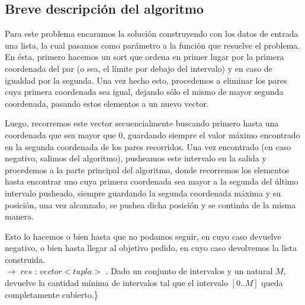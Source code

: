 \documentclass[a4paper, 10pt]{article}
\begin{document}
\subsection{Breve descripción del algoritmo}

Para este problema encaramos la solución construyendo con los datos de entrada una lista, la cual pasamos como parámetro a la función que resuelve el problema. En ésta, primero hacemos un sort que ordena en primer lugar por la primera coordenada del par (o sea, el límite por debajo del intervalo) y en caso de igualdad por la segunda. Una vez hecho esto, procedemos a eliminar los pares cuya primera coordenada sea igual, dejando sólo el mismo de mayor segunda coordenada, pasando estos elementos a un nuevo vector.

Luego, recorremos este vector secuencialmente buscando primero hasta una coordenada que sea mayor que 0, guardando siempre el valor máximo encontrado en la segunda coordenada de los pares recorridos. Una vez encontrado (en caso negativo, salimos del algoritmo), pusheamos este intervalo en la salida y procedemos a la parte principal del algoritmo, donde recorremos los elementos hasta encontrar uno cuya primera coordenada sea mayor a la segunda del último intervalo pusheado, siempre guardando la segunda coordenada máxima y su posición, una vez alcanzado, se pushea dicha posición y se continúa de la misma manera.

Esto lo hacemos o bien hasta que no podamos seguir, en cuyo caso devuelve negativo, o bien hasta llegar al objetivo pedido, en cuyo caso devolvemos la lista construida.\\


 $\rightarrow$ $res$ :
$vector<tupla>$ .
Dado un conjunto de intervalos y un natural $M$, devuelve la cantidad mínima de intervalos tal que el intervalo $[0..M]$ queda completamente cubierto.\} \\
\end{document}
